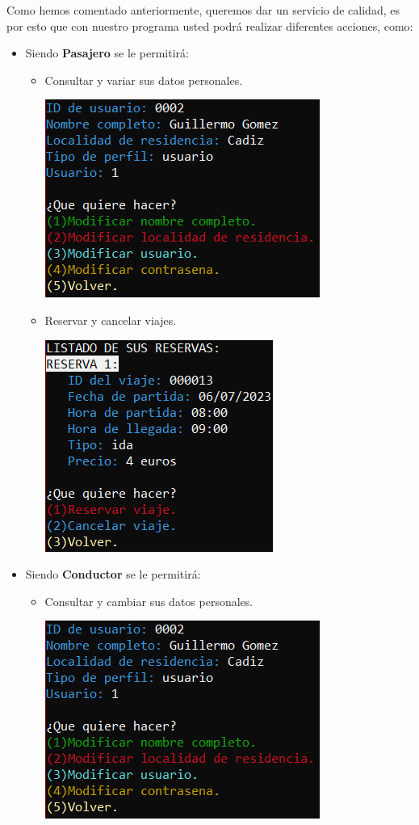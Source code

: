 Como hemos comentado anteriormente, queremos dar un servicio de calidad, es por esto que con nuestro programa usted podrá realizar diferentes acciones, como:
\begin{itemize}
  \item Siendo \textbf{Pasajero} se le permitirá:
  \begin{itemize}
    \item Consultar y variar sus datos personales.
    \begin{center}
      \includegraphics[]{FOTOS/menuPasajeroPerfil.png}
    \end{center}
    \newpage
    \item Reservar y cancelar viajes.
    \begin{center}
      \includegraphics[]{FOTOS/menuPasajeroViaje.png}
    \end{center}
  \end{itemize}
  \item Siendo \textbf{Conductor} se le permitirá:
  \begin{itemize}
    \item Consultar y cambiar sus datos personales.
    \begin{center}
      \includegraphics[]{FOTOS/menuPasajeroPerfil.png}

\end{center}
\end{itemize}
\end{itemize}
